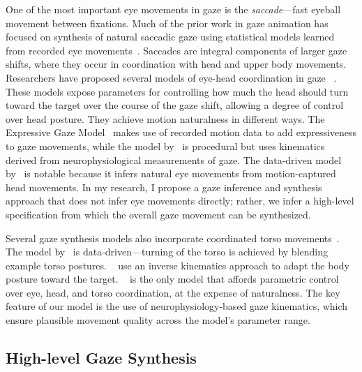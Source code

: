 One of the most important eye movements in gaze is the \emph{saccade}---fast eyeball movement between fixations. Much of the prior work in gaze animation has focused on synthesis of natural saccadic gaze using statistical models learned from recorded eye movements~\cite{deng2005automated,le2012live,lee2002eyes}. Saccades are integral components of larger gaze shifts, where they occur in coordination with head and upper body movements. Researchers have proposed several models of eye-head coordination in gaze ~\cite{peters2010animating,lance2010expressive,andrist2012headeye}. These models expose parameters for controlling how much the head should turn toward the target over the course of the gaze shift, allowing a degree of control over head posture. They achieve motion naturalness in different ways. The Expressive Gaze Model~\cite{lance2010expressive} makes use of recorded motion data to add expressiveness to gaze movements, while the model by~\citet{andrist2012headeye} is procedural but uses kinematics derived from neurophysiological measurements of gaze. The data-driven model by~\citet{ma2009natural} is notable because it infers natural eye movements from motion-captured head movements. In my research, I propose a gaze inference and synthesis approach that does not infer eye movements directly; rather, we infer a high-level specification from which the overall gaze movement can be synthesized.

Several gaze synthesis models also incorporate coordinated torso movements~\citep{thiebaux2009realtime,lance2010expressive,heck2007automated,grillon2009crowds}. The model by~\citet{heck2007automated} is data-driven---turning of the torso is achieved by blending example torso postures. ~\citet{grillon2009crowds} use an inverse kinematics approach to adapt the body posture toward the target. ~\citet{thiebaux2009realtime} is the only model that affords parametric control over eye, head, and torso coordination, at the expense of naturalness.  The key feature of our model is the use of neurophysiology-based gaze kinematics, which ensure plausible movement quality across the model's parameter range.

\subsection{High-level Gaze Synthesis}

